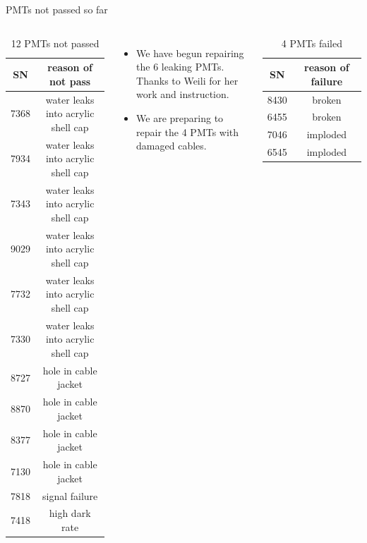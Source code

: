 \documentclass{beamer}
\begin{document}
\begin{frame}{PMTs not passed so far}
\begin{columns}[c] %
	\footnotesize
		\begin{table}
			\begin{tabular}{|c|c|}
			\hline
			SN   & reason of \color{red}not pass \\
			\hline
			\color{cyan}7368 & water leaks into acrylic shell cap \\
			\color{cyan}7934 & water leaks into acrylic shell cap \\
			\color{cyan}7343 & water leaks into acrylic shell cap \\
			\color{cyan}9029 & water leaks into acrylic shell cap \\
			\color{cyan}7732 & water leaks into acrylic shell cap \\
			\color{cyan}7330	&	water leaks into acrylic shell cap \\
			\color{magenta}8727 & hole in cable jacket \\
			\color{magenta}8870 & hole in cable jacket \\
			\color{magenta}8377 & hole in cable jacket \\
			\color{magenta}7130 & hole in cable jacket \\
			7818	&	signal failure \\
			7418	&	high dark rate \\
			\hline
			\end{tabular}
		\caption{12 PMTs not passed}
		\end{table}
	\begin{itemize}
		\item We have begun repairing the 6 {\color{cyan}leaking} PMTs. Thanks to Weili for her work and instruction.
		\item We are preparing to repair the 4 PMTs with {\color{magenta}damaged
		cables}.
	\end{itemize}
	\footnotesize
		\begin{table}
			\begin{tabular}{|c|c|}
			\hline
			SN   & reason of \color{red}failure \\
			\hline
			8430 & broken \\
			6455 & broken \\
			7046 & imploded \\
			6545 & imploded \\
			\hline
			\end{tabular}
		\caption{4 PMTs failed}
		\end{table}
\end{columns}
\end{frame}
\end{document}
